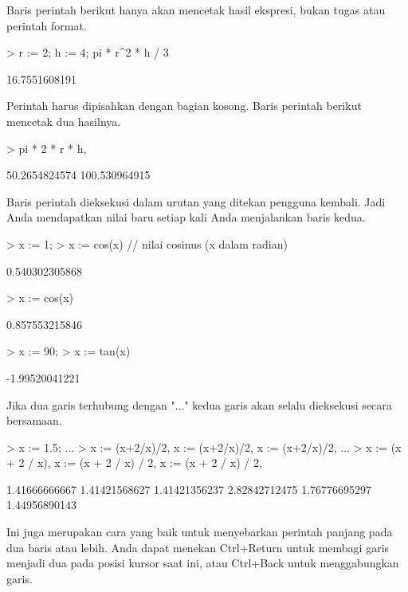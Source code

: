 \documentclass[a4paper,10pt]{article}
\begin{document}
\begin{eulernotebook}
\begin{eulercomment}
\begin{eulercomment}
\begin{eulercomment}
Baris perintah berikut hanya akan mencetak hasil ekspresi, bukan tugas
atau perintah format.
\end{eulercomment}
\begin{eulerprompt}
> r := 2; h := 4; pi * r^2 * h / 3
\end{eulerprompt}
\begin{euleroutput}
  16.7551608191
\end{euleroutput}
\begin{eulercomment}
Perintah harus dipisahkan dengan bagian kosong. Baris perintah berikut
mencetak dua hasilnya.
\end{eulercomment}
\begin{eulerprompt}
> pi * 2 * r * h, %
\end{eulerprompt}
\begin{euleroutput}
  50.2654824574
  100.530964915
\end{euleroutput}
\begin{eulercomment}
Baris perintah dieksekusi dalam urutan yang ditekan pengguna kembali.
Jadi Anda mendapatkan nilai baru setiap kali Anda menjalankan baris
kedua.
\end{eulercomment}
\begin{eulerprompt}
> x := 1;
> x := cos(x) // nilai cosinus (x dalam radian)
\end{eulerprompt}
\begin{euleroutput}
  0.540302305868
\end{euleroutput}
\begin{eulerprompt}
> x := cos(x)
\end{eulerprompt}
\begin{euleroutput}
  0.857553215846
\end{euleroutput}
\begin{eulerprompt}
> x := 90;
> x := tan(x)
\end{eulerprompt}
\begin{euleroutput}
  -1.99520041221
\end{euleroutput}
\begin{eulercomment}
Jika dua garis terhubung dengan "..." kedua garis akan selalu
dieksekusi secara bersamaan.
\end{eulercomment}
\begin{eulerprompt}
> x := 1.5; ...
> x := (x+2/x)/2, x := (x+2/x)/2, x := (x+2/x)/2, ...
> x := (x + 2 / x), x := (x + 2 / x) / 2, x := (x + 2 / x) / 2,
\end{eulerprompt}
\begin{euleroutput}
  1.41666666667
  1.41421568627
  1.41421356237
  2.82842712475
  1.76776695297
  1.44956890143
\end{euleroutput}
\begin{eulercomment}
Ini juga merupakan cara yang baik untuk menyebarkan perintah panjang
pada dua baris atau lebih. Anda dapat menekan Ctrl+Return untuk
membagi garis menjadi dua pada posisi kursor saat ini, atau Ctrl+Back
untuk menggabungkan garis.


\end{eulercomment}
\end{eulercomment}
\end{eulercomment}
\end{eulernotebook}
\end{document}
